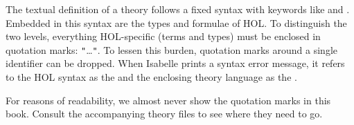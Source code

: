 \begin{isabellebody}
\begin{isamarkuptext}
The textual definition of a theory follows a fixed syntax with keywords like
 and .  Embedded in this syntax are
the types and formulae of HOL.  To distinguish the two levels, everything
HOL-specific (terms and types) must be enclosed in quotation marks:
\texttt{"}\dots\texttt{"}. To lessen this burden, quotation marks around a
single identifier can be dropped.  When Isabelle prints a syntax error
message, it refers to the HOL syntax as the  and the
enclosing theory language as the .
\begin{warn}
For reasons of readability, we almost never show the quotation marks in this
book. Consult the accompanying theory files to see where they need to go.
\end{warn}%
\end{isamarkuptext}%
\isamarkuptrue%
%
\isadelimtheory
%
\endisadelimtheory
%
\isatagtheory
%
\endisatagtheory
{\isafoldtheory}%
%
\isadelimtheory
%
\endisadelimtheory
\end{isabellebody}%
